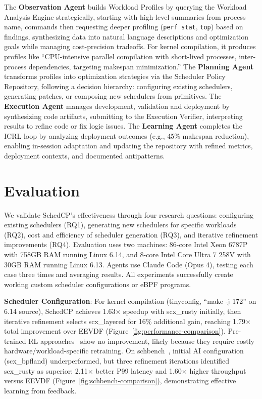 \documentclass[preprint]{article}
\newcommand{\sys}{SchedCP\xspace}
\begin{document}
The \textbf{Observation Agent} builds Workload Profiles by querying the Workload Analysis Engine strategically, starting with high-level summaries from process name, commands then requesting deeper profiling (\texttt{perf stat}, \texttt{top}) based on findings, synthesizing data into natural language descriptions and optimization goals while managing cost-precision tradeoffs. For kernel compilation, it produces profiles like ``CPU-intensive parallel compilation with short-lived processes, inter-process dependencies, targeting makespan minimization.'' The \textbf{Planning Agent} transforms profiles into optimization strategies via the Scheduler Policy Repository, following a decision hierarchy: configuring existing schedulers, generating patches, or composing new schedulers from primitives. The \textbf{Execution Agent} manages development, validation and deployment by synthesizing code artifacts, submitting to the Execution Verifier, interpreting results to refine code or fix logic issues. The \textbf{Learning Agent} completes the ICRL loop by analyzing deployment outcomes (e.g., 45\% makespan reduction), enabling in-session adaptation and updating the repository with refined metrics, deployment contexts, and documented antipatterns.

\section{Evaluation}
\label{sec:evaluation}


We validate \sys's effectiveness through four research questions: configuring existing schedulers (RQ1), generating new schedulers for specific workloads (RQ2), cost and efficiency of scheduler generation (RQ3), and iterative refinement improvements (RQ4). Evaluation uses two machines: 86-core Intel Xeon 6787P with 758GB RAM running Linux 6.14, and 8-core Intel Core Ultra 7 258V with 30GB RAM running Linux 6.13. Agents use Claude Code (Opus 4), testing each case three times and averaging results. All experiments successfully create working custom scheduler configurations or eBPF programs.

\textbf{Scheduler Configuration}: For kernel compilation (tinyconfig, ``make -j 172'' on 6.14 source), \sys achieves 1.63× speedup with scx\_rusty initially, then iterative refinement selects scx\_layered for 16\% additional gain, reaching 1.79× total improvement over EEVDF (Figure~\ref{fig:performance-comparison}). Pre-trained RL approaches~\cite{corbet2025ml} show no improvement, likely because they require costly hardware/workload-specific retraining. On schbench~\cite{schbench2016}, initial AI configuration (scx\_bpfland) underperformed, but three refinement iterations identified scx\_rusty as superior: 2.11× better P99 latency and 1.60× higher throughput versus EEVDF (Figure~\ref{fig:schbench-comparison}), demonstrating effective learning from feedback.
\end{document}
